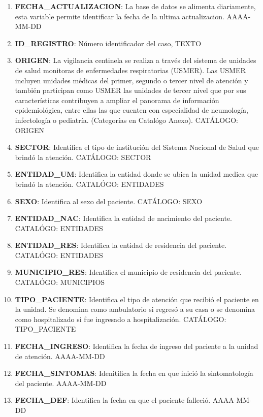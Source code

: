 \begin{enumerate}
	\item \textbf{FECHA\_ACTUALIZACION}: La base de datos se alimenta diariamente, esta variable permite identificar la fecha de la ultima actualizacion. AAAA-MM-DD
	\item \textbf{ID\_REGISTRO}: Número identificador del caso, TEXTO
	\item \textbf{ORIGEN}: La vigilancia centinela se realiza a través del sistema de unidades de salud monitoras de enfermedades respiratorias (USMER). Las USMER incluyen unidades médicas del primer, segundo o tercer nivel de atención y también participan como USMER las unidades de tercer nivel que por sus características contribuyen a ampliar el panorama de información epidemiológica, entre ellas las que cuenten con especialidad de neumología, infectología o pediatría. (Categorías en Catalógo Anexo). CATÁLOGO: ORIGEN                                                              
	\item \textbf{SECTOR}: Identifica el tipo de institución del Sistema Nacional de Salud que brindó la atención. CATÁLOGO: SECTOR                                                               
	\item \textbf{ENTIDAD\_UM}: Identifica la entidad donde se ubica la unidad medica que brindó la atención. CATALÓGO: ENTIDADES
	\item \textbf{SEXO}: Identifica al sexo del paciente. CATÁLOGO: SEXO                              
	\item \textbf{ENTIDAD\_NAC}: Identifica la entidad de nacimiento del paciente. CATALÓGO: ENTIDADES
	\item \textbf{ENTIDAD\_RES}: Identifica la entidad de residencia del paciente. CATALÓGO: ENTIDADES
	\item \textbf{MUNICIPIO\_RES}: Identifica el municipio de residencia del paciente. CATALÓGO: MUNICIPIOS
	\item \textbf{TIPO\_PACIENTE}: Identifica el tipo de atención que recibió el paciente en la unidad. Se denomina como ambulatorio si regresó a su casa o se denomina como hospitalizado si fue ingresado a hospitalización. CATÁLOGO: TIPO\_PACIENTE 
	\item \textbf{FECHA\_INGRESO}: Identifica la fecha de ingreso del paciente a la unidad de atención. AAAA-MM-DD
	\item \textbf{FECHA\_SINTOMAS}: Idenitifica la fecha en que inició la sintomatología del paciente. AAAA-MM-DD
	\item \textbf{FECHA\_DEF}: Identifica la fecha en que el paciente falleció. AAAA-MM-DD

\end{enumerate}
